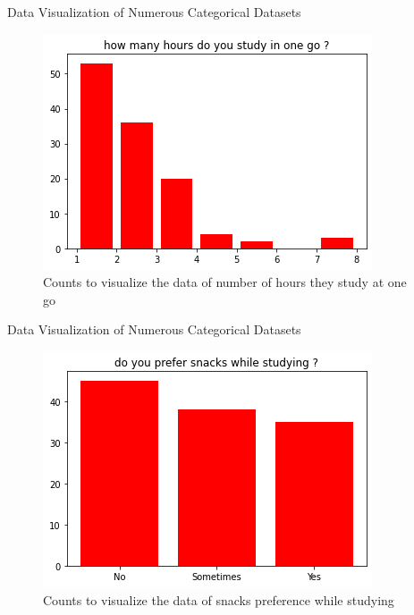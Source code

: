 \documentclass{beamer}
\begin{document}
\begin{frame}
\begin{block}{Data Visualization of Numerous Categorical Datasets}
\begin{figure}[hbtp]
\caption{Counts to visualize the data of number of hours they study at one go}
\centering
\includegraphics[scale=0.60]{hours in one go.png}
\end{figure}
\end{block}
\end{frame}

\begin{frame}
\begin{block}{Data Visualization of Numerous Categorical Datasets}
\begin{figure}[hbtp]
\caption{Counts to visualize the data of snacks preference while studying}
\centering
\includegraphics[scale=0.60]{snacks.png}
\end{figure}
\end{block}
\end{frame}
\end{document}

